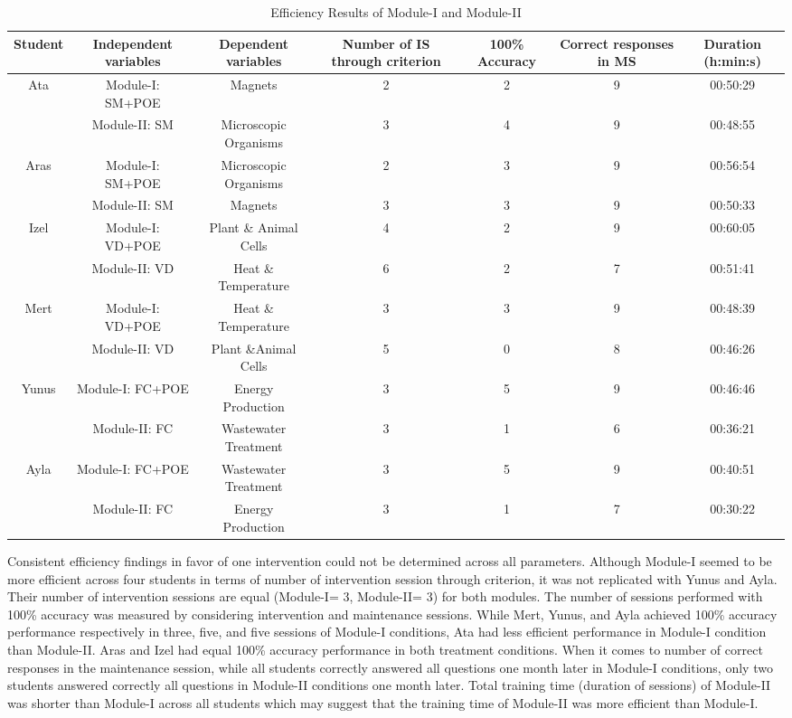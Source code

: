 \documentclass[11.5pt]{sig-alternate} %
\begin{document}
\begin{large}
\begin{table}[th]
\caption{Efficiency Results of Module-I and Module-II}
\begin{tabular}{ccccccc}
\hline
\textbf{Student} & \textbf{Independent variables} & \textbf{Dependent variables} & \textbf{Number of IS through criterion} & \textbf{100\% Accuracy} & \textbf{Correct responses in MS} & \textbf{Duration (h:min:s)} \\ \hline
Ata & Module-I: SM+POE & Magnets & 2 & 2 & 9 & 00:50:29 \\
 & Module-II: SM & Microscopic Organisms & 3 & 4 & 9 & 00:48:55 \\
Aras & Module-I: SM+POE & Microscopic Organisms & 2 & 3 & 9 & 00:56:54 \\
 & Module-II: SM & Magnets & 3 & 3 & 9 & 00:50:33 \\
Izel & Module-I: VD+POE & Plant \& Animal Cells & 4 & 2 & 9 & 00:60:05 \\
 & Module-II: VD & Heat \& Temperature & 6 & 2 & 7 & 00:51:41 \\
Mert & Module-I: VD+POE & Heat \& Temperature & 3 & 3 & 9 & 00:48:39 \\
 & Module-II: VD & Plant \&Animal Cells & 5 & 0 & 8 & 00:46:26 \\
Yunus & Module-I: FC+POE & Energy Production & 3 & 5 & 9 & 00:46:46 \\
 & Module-II: FC & Wastewater Treatment & 3 & 1 & 6 & 00:36:21 \\
Ayla & Module-I: FC+POE & Wastewater Treatment & 3 & 5 & 9 & 00:40:51 \\
 & Module-II: FC & Energy Production & 3 & 1 & 7 & 00:30:22 \\ \hline
\end{tabular}
\end{table}

Consistent efficiency findings in favor of one intervention could not be determined across all parameters. Although Module-I seemed to be more efficient across four students in terms of number of intervention session through criterion, it was not replicated with Yunus and Ayla. Their number of intervention sessions are equal (Module-I= 3, Module-II= 3) for both modules. The number of sessions performed with 100\% accuracy was measured by considering intervention and maintenance sessions. While Mert, Yunus, and Ayla achieved 100\% accuracy performance respectively in three, five, and five sessions of Module-I conditions, Ata had less efficient performance in Module-I condition than Module-II. Aras and Izel had equal 100\% accuracy performance in both treatment conditions. When it comes to number of correct responses in the maintenance session, while all students correctly answered all questions one month later in Module-I conditions, only two students answered correctly all questions in Module-II conditions one month later. Total training time (duration of sessions) of Module-II was shorter than Module-I across all students which may suggest that the training time of Module-II was more efficient than Module-I.


\end{large}
\end{document}
